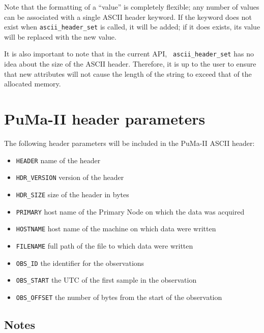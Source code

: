 Note that the formatting of a ``value'' is completely flexible; any
number of values can be associated with a single ASCII header keyword.
If the keyword does not exist when {\tt ascii\_header\_set} is called,
it will be added; if it does exists, its value will be replaced with
the new value.

It is also important to note that in the current API, {\tt
ascii\_header\_set} has no idea about the size of the ASCII header.
Therefore, it is up to the user to ensure that new attributes will not
cause the length of the string to exceed that of the allocated memory.

\section{PuMa-II header parameters}

The following header parameters will be included in the PuMa-II ASCII header:
\begin{itemize}
\item{\tt HEADER} name of the header
\vspace{-2mm}
\item{\tt HDR\_VERSION} version of the header
\vspace{-2mm}
\item{\tt HDR\_SIZE} size of the header in bytes
\vspace{-2mm}
\item{\tt PRIMARY} host name of the Primary Node on which the data was acquired
\vspace{-2mm}
\item{\tt HOSTNAME} host name of the machine on which data were written
\vspace{-2mm}
\item{\tt FILENAME} full path of the file to which data were written
\vspace{-2mm}
\item{\tt OBS\_ID} the identifier for the observations
\vspace{-2mm}
\item{\tt OBS\_START} the UTC of the first sample in the observation
\vspace{-2mm}
\item{\tt OBS\_OFFSET} the number of bytes from the start of the observation
\end{itemize}

\subsection{Notes}


